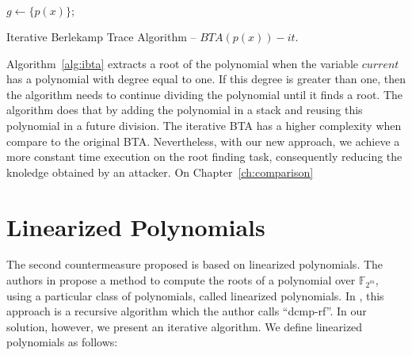 \begin{algorithm}[ht]
    $g \gets \{p(x)\};$ 
 \caption{Iterative Berlekamp Trace Algorithm -- $BTA(p(x))-it$.}
  \label{alg:ibta}
\end{algorithm}

Algorithm~\ref{alg:ibta} extracts a root of the polynomial when the variable $current$ has a polynomial with degree equal to one. If this degree is greater than one, then the algorithm needs to continue dividing the polynomial until it finds a root. The algorithm does that by adding the polynomial in a stack and reusing this polynomial in a future division. The iterative BTA has a higher complexity when compare to the original BTA. Nevertheless, with our new approach, we achieve a more constant time execution on the root finding task, consequently reducing the knoledge obtained by an attacker. On Chapter~\ref{ch:comparison}  

\section{Linearized Polynomials}
The second countermeasure proposed is based on linearized polynomials. The authors in \cite{fedorenko2002finding} propose a method to compute the roots of a polynomial over $\mathbb{F}_{2^m}$, using a particular class of polynomials, called linearized polynomials. In \cite{strenzke2012fast}, this approach is a recursive algorithm which the author calls ``dcmp-rf''. In our solution, however, we present an iterative algorithm. We define linearized polynomials as follows:

